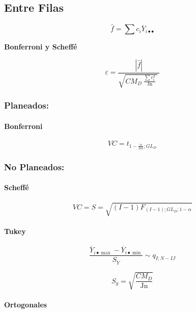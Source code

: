 \documentclass[]{book}
\let\oldparagraph\paragraph
\renewcommand{\paragraph}[1]{\oldparagraph{#1}\mbox{}}
\theoremstyle{definition}
\theoremstyle{definition}
\theoremstyle{definition}
\theoremstyle{remark}
\begin{document}
\hypertarget{entre-filas}{%
\subsection{Entre Filas}\label{entre-filas}}

\[
\hat{f} = \sum c_{i}{\overline{Y}_{i \bullet \bullet}}
\]

\textbf{Bonferroni y Scheffé}

\[
\varepsilon = \frac{\left| \hat{f} \right|}{\sqrt{CM_{D}\left. \ \frac{\sum c_{i}^{2}}{\text{Jn}} \right.\ }\ }
\]

\hypertarget{planeados-1}{%
\subsubsection{Planeados:}\label{planeados-1}}

\hypertarget{bonferroni}{%
\paragraph{Bonferroni}\label{bonferroni}}

\[
VC = t_{1 - \frac{\alpha}{2m};GL_{D}}
\]

\hypertarget{no-planeados-1}{%
\subsubsection{No Planeados:}\label{no-planeados-1}}

\hypertarget{scheffe}{%
\paragraph{Scheffé}\label{scheffe}}

\[
VC = S = \sqrt{\left( I - 1 \right)F_{\left( I - 1 \right);GL_{D};1 - \alpha}}
\]

\hypertarget{tukey}{%
\paragraph{Tukey}\label{tukey}}

\[
\frac{\overline{Y}_{i \bullet \max } - \overline{Y}_{i \bullet \min }}{S_{\overline{Y}}}\sim q_{I;N - IJ}
\]

\[
S_{\overline{y}} = \sqrt{\frac{CM_{D}}{\text{Jn}}}
\]

\hypertarget{ortogonales}{%
\paragraph{Ortogonales}\label{ortogonales}}
\end{document}
